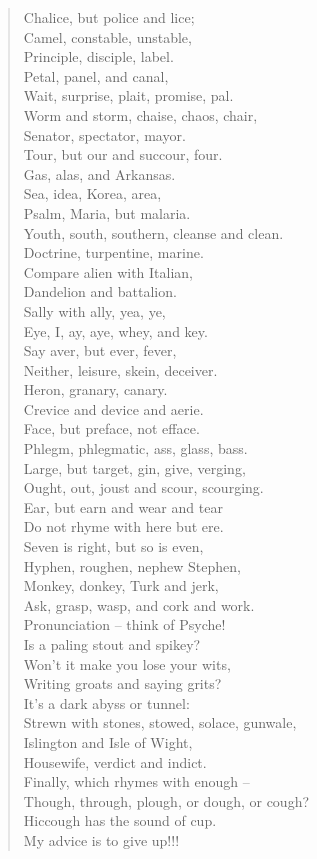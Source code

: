 \documentclass[11pt, oneside]{article}   	%
\begin{document}
\begin{verse}
Chalice, but police and lice; \\
Camel, constable, unstable, \\
Principle, disciple, label.\\
Petal, panel, and canal, \\
Wait, surprise, plait, promise, pal. \\
Worm and storm, chaise, chaos, chair, \\
Senator, spectator, mayor. \\
Tour, but our and succour, four. \\
Gas, alas, and Arkansas. \\
Sea, idea, Korea, area, \\
Psalm, Maria, but malaria. \\
Youth, south, southern, cleanse and clean. \\
Doctrine, turpentine, marine.\\
Compare alien with Italian, \\
Dandelion and battalion. \\
Sally with ally, yea, ye, \\
Eye, I, ay, aye, whey, and key. \\
Say aver, but ever, fever, \\
Neither, leisure, skein, deceiver. \\
Heron, granary, canary. \\
Crevice and device and aerie.\\
Face, but preface, not efface. \\
Phlegm, phlegmatic, ass, glass, bass. \\
Large, but target, gin, give, verging, \\
Ought, out, joust and scour, scourging. \\
Ear, but earn and wear and tear \\
Do not rhyme with here but ere. \\
Seven is right, but so is even, \\
Hyphen, roughen, nephew Stephen, \\
Monkey, donkey, Turk and jerk, \\
Ask, grasp, wasp, and cork and work.\\
Pronunciation -- think of Psyche! \\
Is a paling stout and spikey? \\
Won't it make you lose your wits, \\
Writing groats and saying grits? \\
It's a dark abyss or tunnel: \\
Strewn with stones, stowed, solace, gunwale, \\
Islington and Isle of Wight, \\
Housewife, verdict and indict.\\
Finally, which rhymes with enough -- \\
Though, through, plough, or dough, or cough? \\
Hiccough has the sound of cup. \\
My advice is to give up!!!\\
\end{verse}
\end{document}

